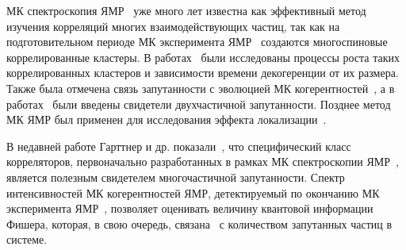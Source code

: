



МК спектроскопия ЯМР~\cite{Baum1985} уже много лет известна как эффективный метод изучения корреляций многих взаимодействующих частиц,
так как на подготовительном периоде МК эксперимента ЯМР~\cite{Baum1985} создаются многоспиновые коррелированные кластеры.
В работах~\cite{Krojanski2004, Cho2006, Bochkin2018} были исследованы процессы роста таких коррелированных кластеров и зависимости времени декогеренции от их размера.
Также была отмечена связь запутанности с эволюцией МК когерентностей~\cite{Doronin2003, Furman2008, Furman2009},
а в работах~\cite{Feldman2008, Feldman2012} были введены свидетели двухчастичной запутанности.
Позднее метод МК ЯМР был применен для исследования эффекта локализации~\cite{Alvarez2010, Alvarez2013, Alvarez2015, Wei2018}.

В недавней работе Гарттнер и др. показали~\cite{Garttner2018},
что специфический класс корреляторов,
первоначально разработанных в рамках МК спектроскопии ЯМР~\cite{Baum1985},
является полезным свидетелем многочастичной запутанности.
Спектр интенсивностей МК когерентностей ЯМР,
детектируемый по окончанию МК эксперимента ЯМР~\cite{Baum1985},
позволяет оценивать величину квантовой информации Фишера,
которая, в свою очередь, связана~\cite{Toth2014} с количеством запутанных частиц в системе.

